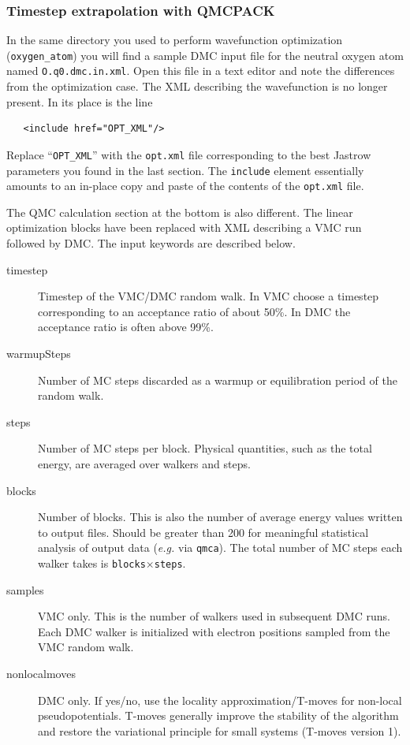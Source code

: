\subsubsection{Timestep extrapolation with QMCPACK}
In the same directory you used to perform wavefunction optimization (\texttt{oxygen\_atom}) you will find a sample DMC input file for the neutral oxygen atom named \texttt{O.q0.dmc.in.xml}.  Open this file in a text editor and note the differences from the optimization case.  The XML describing the wavefunction is no longer present.  In its place is the line
\begin{shaded}
\begin{verbatim}
   <include href="OPT_XML"/>
\end{verbatim}
\end{shaded}
\noindent
Replace ``\texttt{OPT\_XML}'' with the \texttt{opt.xml} file corresponding to the best Jastrow parameters you found in the last section.  The \texttt{include} element essentially amounts to an in-place copy and paste of the contents of the \texttt{opt.xml} file.

The QMC calculation section at the bottom is also different.  The linear optimization blocks have been replaced with XML describing a VMC run followed by DMC.  The input keywords are described below.

\begin{description}
  \item[timestep] Timestep of the VMC/DMC random walk.  In VMC choose a timestep corresponding to an acceptance ratio of about 50\%.  In DMC the acceptance ratio is often above 99\%.
  \item[warmupSteps]  Number of MC steps discarded as a warmup or equilibration period of the random walk.  
  \item[steps] Number of MC steps per block.  Physical quantities, such as the total energy, are averaged over walkers and steps.
  \item[blocks]  Number of blocks.  This is also the number of average energy values written to output files.  Should be greater than 200 for meaningful statistical analysis of output data (\emph{e.g.} via \texttt{qmca}).  The total number of MC steps each walker takes is \texttt{blocks}$\times$\texttt{steps}.
  \item[samples] VMC only. This is the number of walkers used in subsequent DMC runs.  Each DMC walker is initialized with electron positions sampled from the VMC random walk.
  \item[nonlocalmoves] DMC only.  If yes/no, use the locality approximation/T-moves for non-local pseudopotentials.  T-moves generally improve the stability of the algorithm and restore the variational principle for small systems (T-moves version 1).
\end{description}

